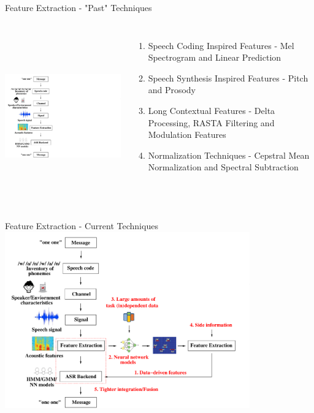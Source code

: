 \begin{frame}{Feature Extraction - "Past" Techniques}
\begin{columns}[T]
    \column{2in}
	\includegraphics[height=73mm]{figures/acoustic}
     \column{2in}
	\begin{enumerate}
	\item \alert{Speech Coding Inspired Features} - Mel Spectrogram and Linear Prediction
	\item \alert{Speech Synthesis Inspired Features} - Pitch and Prosody
	\item \alert{Long Contextual Features} - Delta Processing, RASTA Filtering and Modulation Features
        \item \alert{Normalization Techniques} - Cepstral Mean Normalization and Spectral Subtraction
	\end{enumerate}
\end{columns}
\end{frame}

\begin{frame}{Feature Extraction - Current Techniques}
\includegraphics[height=76mm]{figures/data_driven}
\end{frame}


